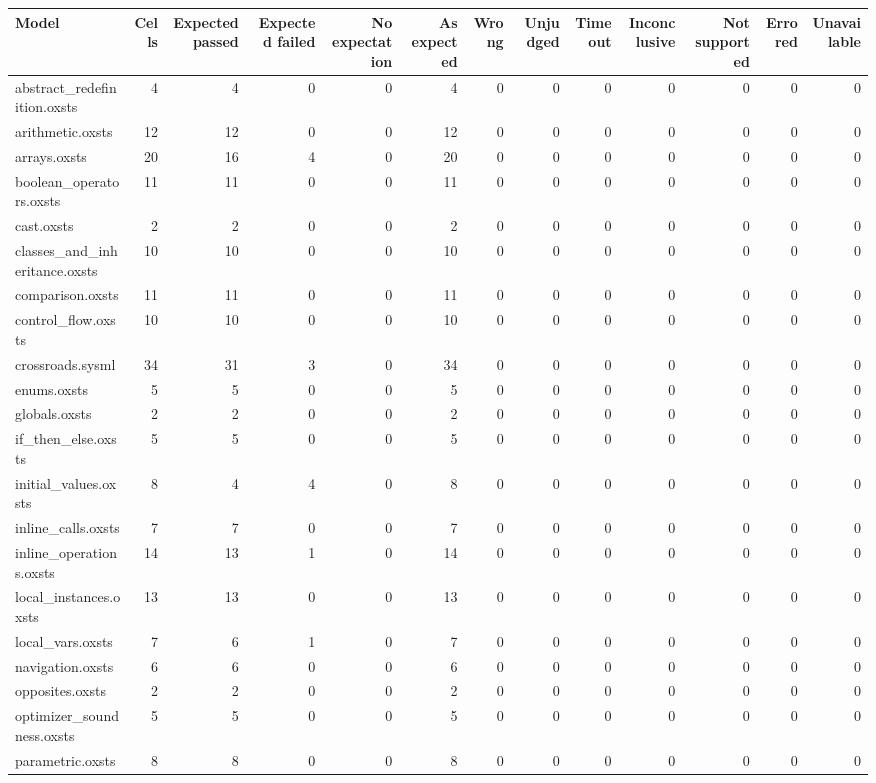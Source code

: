 \begin{tabular}{lrrrrrrrrrrrr}
\toprule
Model & Cells & Expected passed & Expected failed & No expectation & As expected & Wrong & Unjudged & Timeout & Inconclusive & Not supported & Errored & Unavailable \\
\midrule
abstract\_redefinition.oxsts & 4 & 4 & 0 & 0 & 4 & 0 & 0 & 0 & 0 & 0 & 0 & 0 \\
arithmetic.oxsts & 12 & 12 & 0 & 0 & 12 & 0 & 0 & 0 & 0 & 0 & 0 & 0 \\
arrays.oxsts & 20 & 16 & 4 & 0 & 20 & 0 & 0 & 0 & 0 & 0 & 0 & 0 \\
boolean\_operators.oxsts & 11 & 11 & 0 & 0 & 11 & 0 & 0 & 0 & 0 & 0 & 0 & 0 \\
cast.oxsts & 2 & 2 & 0 & 0 & 2 & 0 & 0 & 0 & 0 & 0 & 0 & 0 \\
classes\_and\_inheritance.oxsts & 10 & 10 & 0 & 0 & 10 & 0 & 0 & 0 & 0 & 0 & 0 & 0 \\
comparison.oxsts & 11 & 11 & 0 & 0 & 11 & 0 & 0 & 0 & 0 & 0 & 0 & 0 \\
control\_flow.oxsts & 10 & 10 & 0 & 0 & 10 & 0 & 0 & 0 & 0 & 0 & 0 & 0 \\
crossroads.sysml & 34 & 31 & 3 & 0 & 34 & 0 & 0 & 0 & 0 & 0 & 0 & 0 \\
enums.oxsts & 5 & 5 & 0 & 0 & 5 & 0 & 0 & 0 & 0 & 0 & 0 & 0 \\
globals.oxsts & 2 & 2 & 0 & 0 & 2 & 0 & 0 & 0 & 0 & 0 & 0 & 0 \\
if\_then\_else.oxsts & 5 & 5 & 0 & 0 & 5 & 0 & 0 & 0 & 0 & 0 & 0 & 0 \\
initial\_values.oxsts & 8 & 4 & 4 & 0 & 8 & 0 & 0 & 0 & 0 & 0 & 0 & 0 \\
inline\_calls.oxsts & 7 & 7 & 0 & 0 & 7 & 0 & 0 & 0 & 0 & 0 & 0 & 0 \\
inline\_operations.oxsts & 14 & 13 & 1 & 0 & 14 & 0 & 0 & 0 & 0 & 0 & 0 & 0 \\
local\_instances.oxsts & 13 & 13 & 0 & 0 & 13 & 0 & 0 & 0 & 0 & 0 & 0 & 0 \\
local\_vars.oxsts & 7 & 6 & 1 & 0 & 7 & 0 & 0 & 0 & 0 & 0 & 0 & 0 \\
navigation.oxsts & 6 & 6 & 0 & 0 & 6 & 0 & 0 & 0 & 0 & 0 & 0 & 0 \\
opposites.oxsts & 2 & 2 & 0 & 0 & 2 & 0 & 0 & 0 & 0 & 0 & 0 & 0 \\
optimizer\_soundness.oxsts & 5 & 5 & 0 & 0 & 5 & 0 & 0 & 0 & 0 & 0 & 0 & 0 \\
parametric.oxsts & 8 & 8 & 0 & 0 & 8 & 0 & 0 & 0 & 0 & 0 & 0 & 0 \\

\end{tabular}
